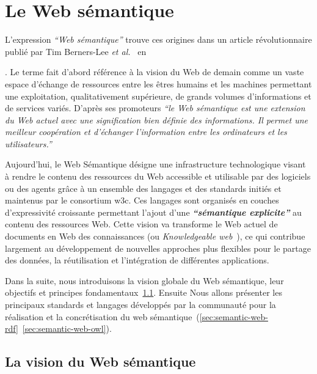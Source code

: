 \chapter{Le Web sémantique}
\label{annexe:semantic-web}

L'expression \emph{``Web sémantique''} trouve ces origines dans un
article révolutionnaire publié par Tim Berners-Lee \emph{et
  al.}~\cite{berners2001semantic} en \date{2001}. Le terme fait
d'abord référence à la vision du Web de demain comme un vaste espace
d'échange de ressources entre les êtres humains et les machines
permettant une exploitation, qualitativement supérieure, de grands
volumes d'informations et de services variés. D'après ses promoteurs
\emph{``le Web sémantique est une extension du Web actuel avec une
  signification bien définie des informations. Il permet une meilleur
  coopération et d'échanger l'information entre les ordinateurs et les
  utilisateurs.''}\medskip

Aujourd'hui, le Web Sémantique désigne une infrastructure
technologique visant à rendre le contenu des ressources du Web
accessible et utilisable par des logiciels ou des agents grâce à un
ensemble des langages et des standards initiés et maintenus par le
consortium \acrshort{w3c}. Ces langages sont organisés en couches
d'expressivité croissante permettant l'ajout d'une
\emph{\textbf{``sémantique explicite''}} au contenu des ressources
Web. Cette vision va transforme le Web actuel de documents en Web des
connaissances (ou \emph{Knowledgeable web}~\cite{decker2000semantic}),
ce qui contribue largement au développement de nouvelles approches
plus flexibles pour le partage des données, la réutilisation et
l'intégration de différentes applications.\medskip

Dans la suite, nous introduisons la vision globale du Web sémantique,
leur objectifs et principes
fondamentaux~\ref{sec:semantic-web-vision}. Ensuite Nous allons
présenter les principaux standards et langages développés par la
communauté pour la réalisation et la concrétisation du web
sémantique~(\ref{sec:semantic-web-rdf}~\ref{sec:semantic-web-owl}).

\newpage
\section{La vision du Web sémantique}
\label{sec:semantic-web-vision}



